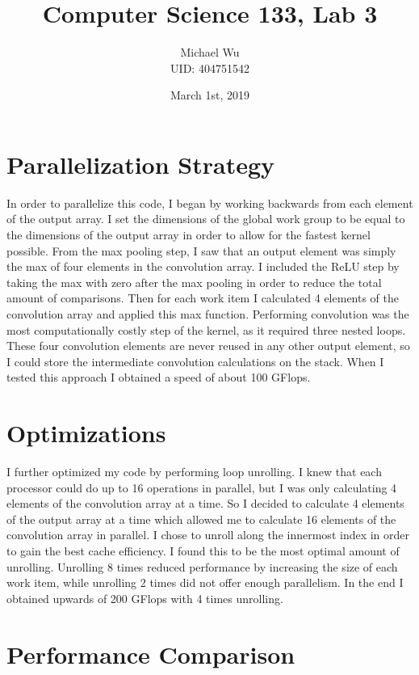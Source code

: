 \documentclass[12pt]{article}
\begin{document}
\title{Computer Science 133, Lab 3}
\date{March 1st, 2019}
\author{Michael Wu\\UID: 404751542}
\maketitle

\section{Parallelization Strategy}

In order to parallelize this code, I began by working backwards from each element of the
output array. I set the dimensions of the global work group to be equal to the dimensions of the output
array in order to allow for the fastest kernel possible. From the max pooling step, I saw that an output
element was simply the max of four elements in the convolution array. I included the ReLU step by taking the max
with zero after the max pooling in order to reduce the total amount of comparisons. Then for each work item
I calculated 4 elements of the convolution array and applied this max function. Performing convolution was
the most computationally costly step of the kernel, as it required three nested loops. These four
convolution elements are never reused in any other output element, so I could store the intermediate convolution
calculations on the stack. When I tested this approach I obtained a speed of about 100 GFlops.

\section{Optimizations}

I further optimized my code by performing loop unrolling. I knew that each processor could do up to 16 operations
in parallel, but I was only calculating 4 elements of the convolution array at a time. So I decided to calculate
4 elements of the output array at a time which allowed me to calculate 16 elements of the convolution array in parallel.
I chose to unroll along the innermost index in order to gain the best cache efficiency. I found this to be the most optimal
amount of unrolling. Unrolling 8 times reduced performance by increasing the size of each work item, while unrolling 2 times
did not offer enough parallelism. In the end I obtained upwards of 200 GFlops with 4 times unrolling.

\section{Performance Comparison}
\end{document}
